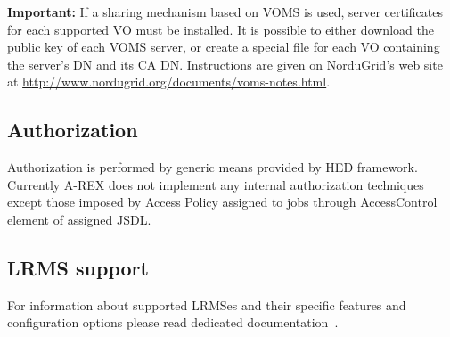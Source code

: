 \documentclass{article}                            %
\begin{document}
\textbf{Important:} If a sharing mechanism based on VOMS is used,
server certificates for each supported VO must be installed. It is
possible to either download the public key of each VOMS server, or
create a special file for each VO containing the server's DN and its
CA DN. Instructions are given on NorduGrid's web site at
\url{http://www.nordugrid.org/documents/voms-notes.html}.

\subsection{Authorization\label{sub:Authorization}}

Authorization is performed by generic means provided by HED framework.
Currently A-REX does not implement any internal authorization techniques
except those imposed by Access Policy assigned to jobs through AccessControl
element of assigned JSDL.

\subsection{LRMS support\label{sub:LRMS}}

For information about supported LRMSes and their specific features
and configuration options please read dedicated documentation~\cite{arc1-backends}.
\end{document}
